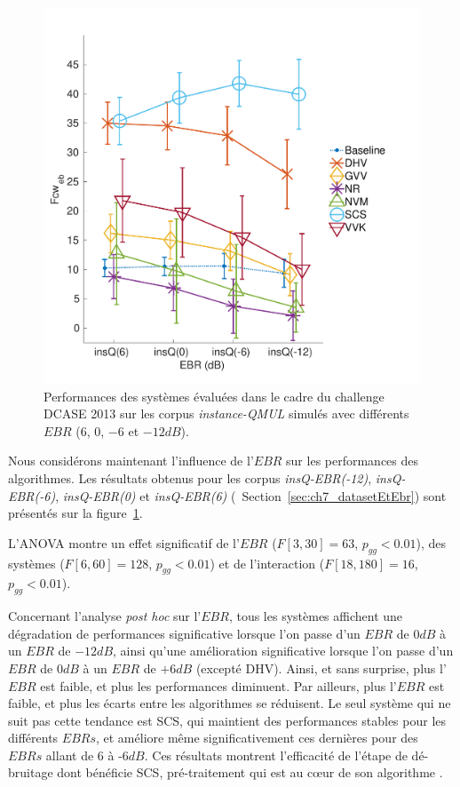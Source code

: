 \begin{figure}[t]
\begin{center}
\includegraphics[width=1\columnwidth]{gfx/ch_7/dcase2013_2}
\caption{Performances des systèmes évaluées dans le cadre du challenge DCASE 2013 sur les corpus \emph{instance-QMUL} simulés avec différents $EBR$ ($6$, $0$, $-6$ et $-12dB$).}
\label{fig:ebr} 
\end{center}
\end{figure}

Nous considérons maintenant l'influence de l'$EBR$ sur les performances des algorithmes. Les résultats obtenus pour les corpus \emph{insQ-EBR(-12)}, \emph{insQ-EBR(-6)}, \emph{insQ-EBR(0)} et \emph{insQ-EBR(6)} (\cf~Section~\ref{sec:ch7_datasetEtEbr}) sont présentés sur la figure~\ref{fig:ebr}. 

L'ANOVA montre un effet significatif de l'$EBR$ ($F[3,30]=63$, $p_{gg}<0.01$), des systèmes ($F[6,60]=128$, $p_{gg}<0.01$) et de l'interaction ($F[18,180]=16$, $p_{gg}<0.01$).

Concernant l'analyse \emph{post hoc} sur l'$EBR$, tous les systèmes affichent une dégradation de performances significative lorsque l'on passe d'un $EBR$ de $0dB$ à un $EBR$ de $-12dB$, ainsi qu'une amélioration significative lorsque l'on passe d'un $EBR$ de $0dB$ à un $EBR$ de $+6dB$ (excepté DHV). Ainsi, et sans surprise, plus l'$EBR$ est faible, et plus les performances diminuent. Par ailleurs, plus l'$EBR$ est faible, et plus les écarts entre les algorithmes se réduisent. Le seul système qui ne suit pas cette tendance est SCS, qui maintient des performances stables pour les différents $EBRs$, et améliore même significativement ces dernières pour des $EBRs$ allant de $6$ à -6$dB$. Ces résultats montrent l'efficacité de l'étape de dé-bruitage dont bénéficie SCS, pré-traitement qui est au cœur de son algorithme \citep{SCS}. \\

